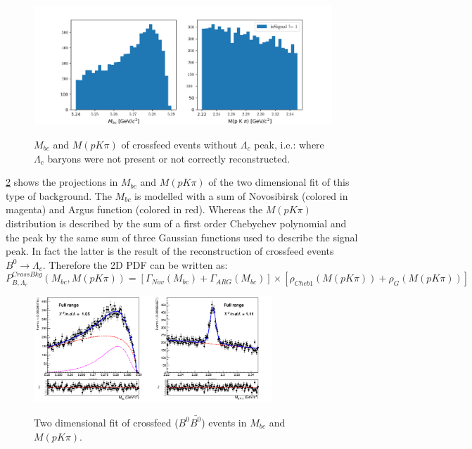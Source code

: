 \begin{figure}[H]
\centering
{\includegraphics[width=1\textwidth]{04-chargedCorrBtoLambda/figs/chargedBcorr_CrossfeedNoLambdaCpeak.png}}
\caption{$M_{bc}$ and $M(p K \pi)$ of crossfeed events without $ \Lambda_c$ peak, i.e.: where $ \Lambda_c$ baryons were not present or not correctly reconstructed. }
\label{fig:chargedBcorr_CrossfeedNoLambdaCpeak}
\end{figure}

\noindent \cref{fig:5streams_Crossfeed_charged_corrLambdaC_2Dfit} shows the projections in $M_{bc}$  and $M(p K \pi)$ of the two dimensional fit of this type of background.
The $M_{bc}$ is modelled with a sum of Novosibirsk (colored in magenta) and Argus function (colored in red). Whereas the $M(p K \pi)$ distribution is described by the sum of a first order Chebychev polynomial and the peak by the same sum of three Gaussian functions used to describe the signal peak. In fact the latter is the result of the reconstruction of crossfeed events $B^0 \rightarrow \Lambda_c$.  Therefore the 2D PDF can be written as:\\

\begin{equation}
P^{CrossBkg}_{B,\Lambda_c}(M_{bc}, M(p K \pi)) = [\Gamma_{Nov}(M_{bc}) + \Gamma_{ARG}(M_{bc})] \times [\rho_{Cheb1}(M(p K \pi)) + \rho_{G}(M(p K \pi))]
\end{equation}

\begin{figure}[H]
\centering
{\includegraphics[width=0.8\textwidth]{04-chargedCorrBtoLambda/figs/stream12345_Crossfeed_charged_corrLambdaC_2Dfit.png}}
\caption{Two dimensional fit of crossfeed ($B^0\bar{B^0}$) events in $M_{bc}$  and $M(p K \pi)$. }
\label{fig:5streams_Crossfeed_charged_corrLambdaC_2Dfit}
\end{figure}


